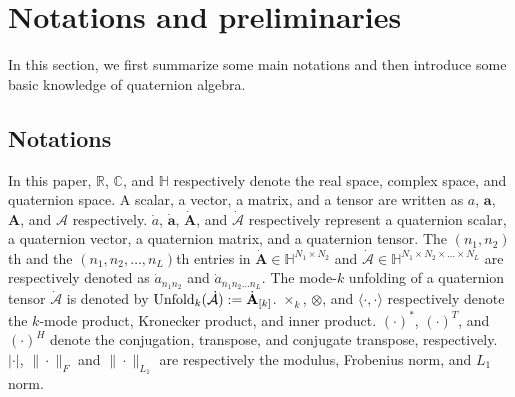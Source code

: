\documentclass[journal]{IEEEtran}
\begin{document}
\section{Notations and preliminaries}
\label{sec2}
In this section, we first summarize some main notations and
then introduce some basic knowledge of quaternion algebra.

\subsection{Notations}
In this paper, $\mathbb{R}$, $\mathbb{C}$, and $\mathbb{H}$ respectively denote the real space, complex space, and quaternion space. A scalar, a vector, a matrix, and a tensor are written as $a$, $\mathbf{a}$, $\mathbf{A}$, and $\mathcal{A}$ respectively. $\dot{a}$,  $\dot{\mathbf{a}}$, $\dot{\mathbf{A}}$, and $\dot{\mathcal{A}}$ 
respectively represent a quaternion scalar, a quaternion vector, a quaternion matrix, and a quaternion tensor. The $(n_{1},n_{2})$th and the $(n_{1}, n_{2},\ldots, n_{L})$th entries in $\dot{\mathbf{A}}\in\mathbb{H}^{N_{1}\times N_{2}}$ and $\dot{\mathcal{A}}\in\mathbb{H}^{N_{1}\times N_{2} \times\ldots \times N_{L}}$ are respectively denoted as $\dot{a}_{n_{1}n_{2}}$ and $\dot{a}_{n_{1}n_{2}\ldots n_{L}}$. The mode-$k$ unfolding of a quaternion tensor $\dot{\mathcal{A}}$ is denoted by ${\rm{Unfold}}_{k}(\dot{\mathcal{A}}):=\dot{\mathbf{A}}_{[k]}$. $\times_{k}$,  $\otimes$, and $\langle\cdot,\cdot\rangle$  respectively denote the $k$-mode product, Kronecker product, and inner product. $(\cdot)^{\ast}$, $(\cdot)^{T}$, and $(\cdot)^{H}$ denote the conjugation, transpose, and  conjugate transpose, respectively. $|\cdot|$, $\|\cdot\|_{F}$ and $\|\cdot\|_{L_{1}}$ are respectively the modulus, Frobenius norm, and $L_{1}$ norm.
\end{document}
